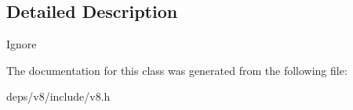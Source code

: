 \subsection{Detailed Description}
Ignore 

The documentation for this class was generated from the following file\+:\begin{DoxyCompactItemize}
\item 
deps/v8/include/v8.\+h\end{DoxyCompactItemize}
